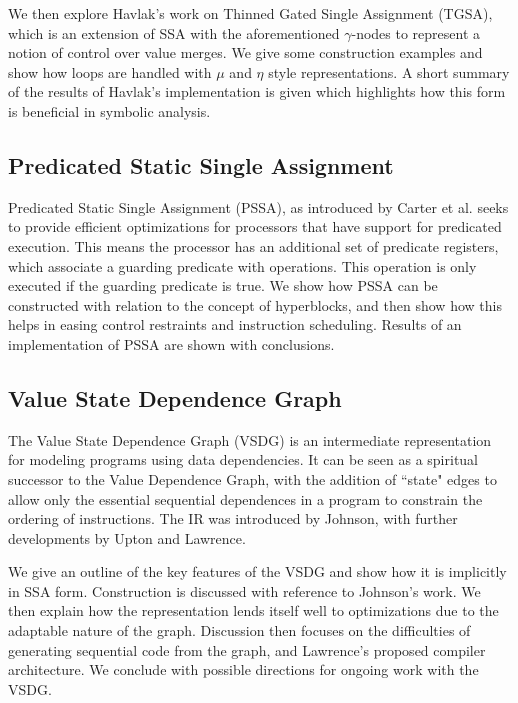We then explore Havlak's work\cite{Havlak93constructionof} on Thinned Gated Single Assignment (TGSA), which is an extension of SSA with the aforementioned $\gamma$-nodes to represent a notion of control over value merges. We give some construction examples and show how loops are handled with $\mu$ and $\eta$ style representations. A short summary of the results of Havlak's implementation is given which highlights how this form is beneficial in symbolic analysis.

\subsection*{Predicated Static Single Assignment}

Predicated Static Single Assignment (PSSA), as introduced by Carter et al.\cite{carter99predicated} seeks to provide efficient optimizations for processors that have support for predicated execution. This means the processor has an additional set of predicate registers, which associate a guarding predicate with operations. This operation is only executed if the guarding predicate is true. We show how PSSA can be constructed with relation to the concept of hyperblocks, and then show how this helps in easing control restraints and instruction scheduling. Results of an implementation of PSSA are shown with conclusions.

\subsection*{Value State Dependence Graph}

The Value State Dependence Graph (VSDG) is an intermediate representation for modeling programs using data dependencies. It can be seen as a spiritual successor to the Value Dependence Graph\cite{177907}, with the addition of ``state" edges to allow only the essential sequential dependences in a program to constrain the ordering of instructions. The IR was introduced by Johnson\cite{UCAM-CL-TR-607,johnson-combined}, with further developments by Upton\cite{upton} and Lawrence\cite{UCAM-CL-TR-705}.

We give an outline of the key features of the VSDG and show how it is implicitly in SSA form. Construction is discussed with reference to Johnson's work. We then explain how the representation lends itself well to optimizations due to the adaptable nature of the graph. Discussion then focuses on the difficulties of generating sequential code from the graph\cite{DBLP:conf/pdpta/Upton03}, and Lawrence's proposed compiler architecture. We conclude with possible directions for ongoing work with the VSDG.
